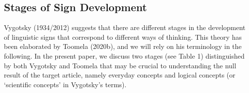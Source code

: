 \documentclass[authordate, reflection]{jote-new-article}
\begin{document}
	\subsection{Stages of Sign Development}



	Vygotsky (1934/2012) suggests that there are different stages in the development of linguistic signs that correspond to different ways of thinking. This theory has been elaborated by Toomela (2020b), and we will rely on his terminology in the following. In the present paper, we discuss two stages (see Table 1) distinguished by both Vygotsky and Toomela that may be crucial to understanding the null result of the target article, namely everyday concepts and logical concepts (or ‘scientific concepts' in Vygotsky's terms).
\end{document}
